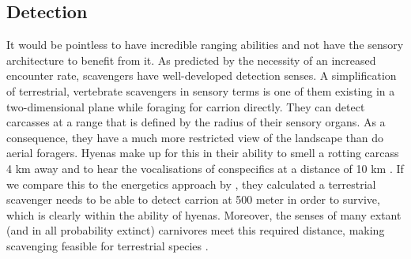 \documentclass[a4paper,12pt]{article}
\begin{document}
\subsection*{Detection}
It would be pointless to have incredible ranging abilities and not have the sensory architecture to benefit from it.
As predicted by the necessity of an increased encounter rate, scavengers have well-developed detection senses.
A simplification of terrestrial, vertebrate scavengers in sensory terms is one of them existing in a two-dimensional plane while foraging for carrion directly.
They can detect carcasses at a range that is defined by the radius of their sensory organs. %
As a consequence, they have a much more restricted view of the landscape than do aerial foragers.
Hyenas make up for this in their ability to smell a rotting carcass 4 km away and to hear the vocalisations of conspecifics at a distance of 10 km \citep{mills1989comparative}. 
If we compare this to the energetics approach by \cite{ruxton2004obligate}, they calculated a terrestrial scavenger needs to be able to detect carrion at 500 meter in order to survive, which is clearly within the ability of hyenas.  
Moreover, the senses of many extant (and in all probability extinct) carnivores meet this required distance, making scavenging feasible for terrestrial species \citep{farlow1994speculations,mech2010wolves}. 
\end{document}
